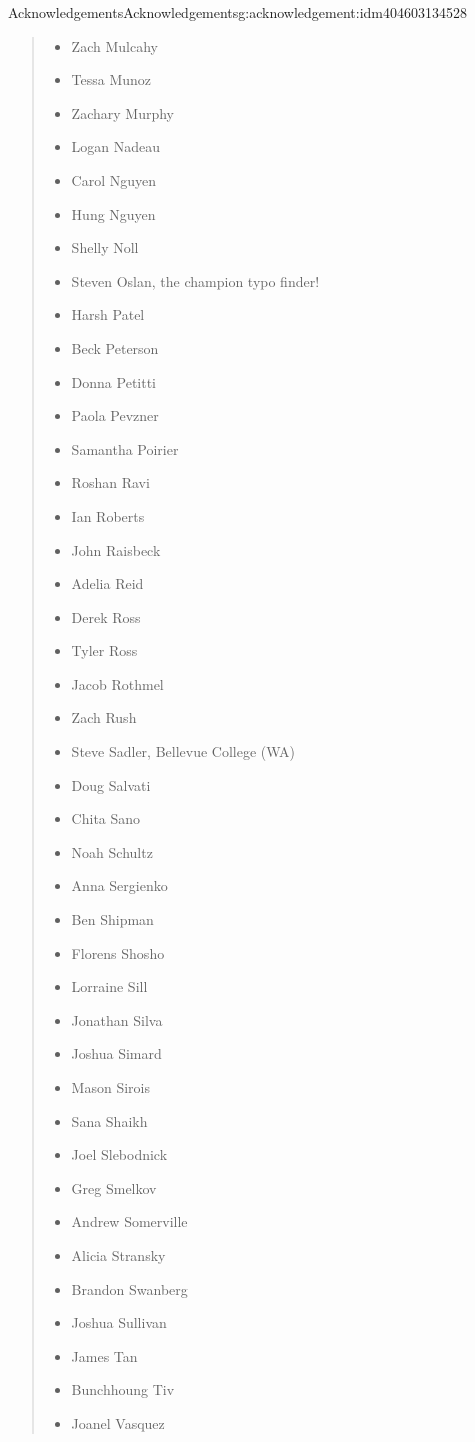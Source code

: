 \documentclass[twoside,10pt,]{book}
\numberwithin{equation}{section}
\begin{document}
\begin{acknowledgement}{Acknowledgements}{}{Acknowledgements}{}{}{g:acknowledgement:idm404603134528}
\begin{quote}
\begin{multicols}{2}
\begin{itemize}[label=\textbullet]
\item{}Zach Mulcahy%
\item{}Tessa Munoz%
\item{}Zachary Murphy%
\item{}Logan Nadeau%
\item{}Carol Nguyen%
\item{}Hung Nguyen%
\item{}Shelly Noll%
\item{}Steven Oslan, the champion typo finder!%
\item{}Harsh Patel%
\item{}Beck Peterson%
\item{}Donna Petitti%
\item{}Paola Pevzner%
\item{}Samantha Poirier%
\item{}Roshan Ravi%
\item{}Ian Roberts%
\item{}John Raisbeck%
\item{}Adelia Reid%
\item{}Derek Ross%
\item{}Tyler Ross%
\item{}Jacob Rothmel%
\item{}Zach Rush%
\item{}Steve Sadler, Bellevue College (WA)%
\item{}Doug Salvati%
\item{}Chita Sano%
\item{}Noah Schultz%
\item{}Anna Sergienko%
\item{}Ben Shipman%
\item{}Florens Shosho%
\item{}Lorraine Sill%
\item{}Jonathan Silva%
\item{}Joshua Simard%
\item{}Mason Sirois%
\item{}Sana Shaikh%
\item{}Joel Slebodnick%
\item{}Greg Smelkov%
\item{}Andrew Somerville%
\item{}Alicia Stransky%
\item{}Brandon Swanberg%
\item{}Joshua Sullivan%
\item{}James Tan%
\item{}Bunchhoung Tiv%
\item{}Joanel Vasquez%

\end{itemize}
\end{multicols}
\end{quote}
\end{acknowledgement}
\end{document}

